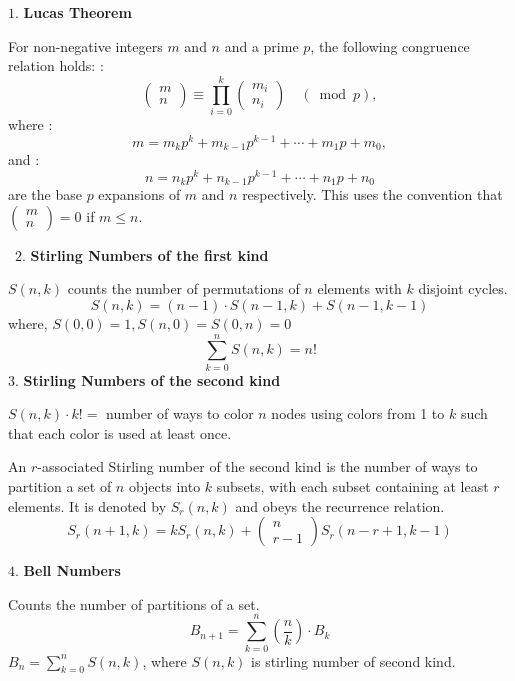$1.$ \textbf{Lucas Theorem}


For non-negative integers $m$ and $n$ and a prime $p$, the following congruence relation holds: :
\begin{equation}
\left(\begin{array}{c}
m \\
n
\end{array}\right) \equiv \prod_{i=0}^k\left(\begin{array}{c}
m_i \\
n_i
\end{array}\right) \quad(\bmod p),
\end{equation}
where :
$$
m=m_k p^k+m_{k-1} p^{k-1}+\cdots+m_1 p+m_0,
$$
and :
$$
n=n_k p^k+n_{k-1} p^{k-1}+\cdots+n_1 p+n_0
$$
are the base $p$ expansions of $m$ and $n$ respectively. This uses the convention that $\left(\begin{array}{c}m \\ n\end{array}\right)=0$ if $m \leq n$.

\
$2.$ \textbf{Stirling Numbers of the first kind}

$S(n, k)$ counts the number of permutations of $n$ elements with $k$ disjoint cycles.
\begin{equation}
S(n, k)=(n-1) \cdot S(n-1, k)+S(n-1, k-1)
\end{equation}
where, $S(0,0)=1, S(n, 0)=S(0, n)=0$
\begin{equation}
\sum_{k=0}^n S(n, k)=n !
\end{equation}
$3.$ \textbf{Stirling Numbers of the second kind}

\textbf{$S(n, k) \cdot k !=$} number of ways to color $n$ nodes using colors from 1 to $k$ such that each color is used at least once.


An $r$-associated Stirling number of the second kind is the number of ways to partition a set of $n$ objects into $k$ subsets, with each subset containing at least $r$ elements. It is denoted by $S_r(n, k)$ and obeys the recurrence relation. 
\begin{equation}
S_r(n+1, k)=k S_r(n, k)+\left(\begin{array}{c}n \\ r-1\end{array}\right) S_r(n-r+1, k-1)   
\end{equation}

$4.$ \textbf{Bell Numbers}


Counts the number of partitions of a set.
\begin{equation}
B_{n+1}=\sum_{k=0}^n\left(\frac{n}{k}\right) \cdot B_k
\end{equation}
$B_n=\sum_{k=0}^n S(n, k)$, where $S(n, k)$ is stirling number of second kind.

